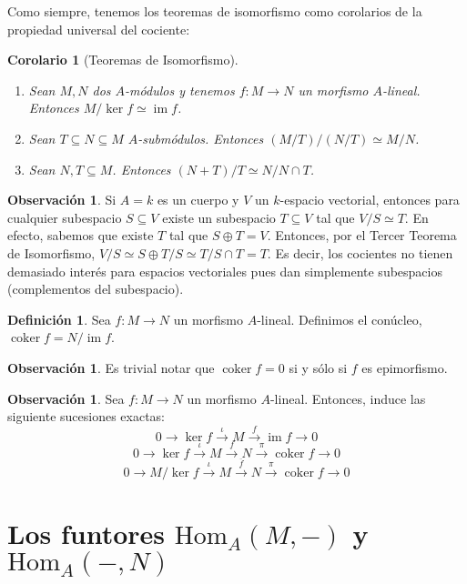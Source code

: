 \documentclass[12pt]{book}
\newtheorem{cor}[teo]{Corolario}
\theoremstyle{definition}
\newtheorem{obs}[teo]{Observación}
\newtheorem{defn}[teo]{Definición}
\renewcommand{\hom}{\mathrm{Hom}}
\DeclareMathOperator{\im}{im}
\DeclareMathOperator{\coker}{coker}
\begin{document}
Como siempre, tenemos los teoremas de isomorfismo como corolarios de la propiedad universal del cociente:

\begin{cor}[Teoremas de Isomorfismo]
\begin{enumerate}
\item Sean $M,N$ dos $A$-módulos y tenemos $f:M\to N$ un morfismo $A$-lineal. Entonces $M/\ker f\simeq \im f$.
\item Sean $T\subseteq N\subseteq M$ $A$-submódulos. Entonces $(M/T)/(N/T)\simeq M/N$.
\item Sean $N,T\subseteq M$. Entonces $(N+T)/T\simeq N/N\cap T$.
\end{enumerate}
\end{cor}

\begin{obs}
Si $A=k$ es un cuerpo y $V$ un $k$-espacio vectorial, entonces para cualquier subespacio $S\subseteq V$ existe un subespacio $T\subseteq V$ tal que $V/S\simeq T$. En efecto, sabemos que existe $T$ tal que $S\oplus T = V$. Entonces, por el Tercer Teorema de Isomorfismo, $V/S \simeq S\oplus T / S \simeq T/S\cap T = T$. Es decir, los cocientes no tienen demasiado interés para espacios vectoriales pues dan simplemente subespacios (complementos del subespacio).
\end{obs}

\begin{defn}
Sea $f:M\to N$ un morfismo $A$-lineal. Definimos el conúcleo, $\coker f = N/\im f$.
\end{defn}

\begin{obs}
Es trivial notar que $\coker f = 0$ si y sólo si $f$ es epimorfismo.
\end{obs}

\begin{obs}
Sea $f:M\to N$ un morfismo $A$-lineal. Entonces, induce las siguiente sucesiones exactas:
$$0\longrightarrow \ker f \stackrel{\iota}{\longrightarrow} M\stackrel{f}{\longrightarrow} \im f \longrightarrow 0$$
$$0\longrightarrow \ker f \stackrel{\iota}{\longrightarrow} M\stackrel{f}{\longrightarrow} N\stackrel{\pi}{\longrightarrow} \coker f\longrightarrow 0$$
$$0\longrightarrow M/\ker f \stackrel{\iota}{\longrightarrow} M\stackrel{\overline{f}}{\longrightarrow} N \stackrel{\pi}{\longrightarrow}\coker f\longrightarrow 0 $$

\end{obs}

\section{Los funtores \texorpdfstring{$\hom_A(M,-)$}{homA(M,-)} y \texorpdfstring{$\hom_A(-,N)$}{homA(-,N)}}
\end{document}
